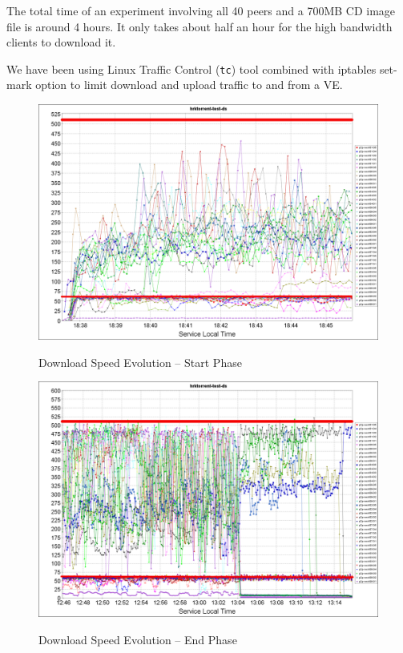 The total time of an experiment involving all 40 peers and a 700MB CD image
file is around 4 hours. It only takes about half an hour for the high
bandwidth clients to download it.

We have been using Linux Traffic Control (\texttt{tc}) tool combined with
iptables set-mark option to limit download and upload traffic to and from a
VE.

\begin{figure}
  \centering
  \begin{minipage}{0.8\textwidth}
    \includegraphics[width=\textwidth]{src/img/virt-infra/test-monalisa-virt-env-start.png}
    \caption{Download Speed Evolution -- Start Phase}
    \label{fig:virt-infra:mon-down-ini}
    \vspace{0.2cm}
    \includegraphics[width=\textwidth]{src/img/virt-infra/test-monalisa-virt-env-stop.png}
    \caption{Download Speed Evolution -- End Phase}
    \label{fig:virt-infra:mon-down-fin}
  \end{minipage}
\end{figure}

